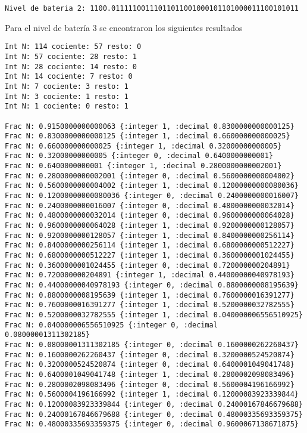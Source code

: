 \documentclass[stu, 12pt, letterpaper, donotrepeattitle, floatsintext, natbib]{apa7}
\begin{document}
\begin{verbatim}
Nivel de bateria 2: 1100.01111100111011011001000101101000011100101011
\end{verbatim}


Para el nivel de batería 3 se encontraron los siguientes resultados

\begin{verbatim}
Int N: 114 cociente: 57 resto: 0
Int N: 57 cociente: 28 resto: 1
Int N: 28 cociente: 14 resto: 0
Int N: 14 cociente: 7 resto: 0
Int N: 7 cociente: 3 resto: 1
Int N: 3 cociente: 1 resto: 1
Int N: 1 cociente: 0 resto: 1

Frac N: 0.9150000000000063 {:integer 1, :decimal 0.8300000000000125}
Frac N: 0.8300000000000125 {:integer 1, :decimal 0.660000000000025}
Frac N: 0.660000000000025 {:integer 1, :decimal 0.32000000000005}
Frac N: 0.32000000000005 {:integer 0, :decimal 0.6400000000001}
Frac N: 0.6400000000001 {:integer 1, :decimal 0.2800000000002001}
Frac N: 0.2800000000002001 {:integer 0, :decimal 0.5600000000004002}
Frac N: 0.5600000000004002 {:integer 1, :decimal 0.12000000000080036}
Frac N: 0.12000000000080036 {:integer 0, :decimal 0.2400000000016007}
Frac N: 0.2400000000016007 {:integer 0, :decimal 0.4800000000032014}
Frac N: 0.4800000000032014 {:integer 0, :decimal 0.9600000000064028}
Frac N: 0.9600000000064028 {:integer 1, :decimal 0.9200000000128057}
Frac N: 0.9200000000128057 {:integer 1, :decimal 0.8400000000256114}
Frac N: 0.8400000000256114 {:integer 1, :decimal 0.6800000000512227}
Frac N: 0.6800000000512227 {:integer 1, :decimal 0.3600000001024455}
Frac N: 0.3600000001024455 {:integer 0, :decimal 0.720000000204891}
Frac N: 0.720000000204891 {:integer 1, :decimal 0.44000000040978193}
Frac N: 0.44000000040978193 {:integer 0, :decimal 0.8800000008195639}
Frac N: 0.8800000008195639 {:integer 1, :decimal 0.7600000016391277}
Frac N: 0.7600000016391277 {:integer 1, :decimal 0.5200000032782555}
Frac N: 0.5200000032782555 {:integer 1, :decimal 0.040000006556510925}
Frac N: 0.040000006556510925 {:integer 0, :decimal 0.08000001311302185}
Frac N: 0.08000001311302185 {:integer 0, :decimal 0.1600000262260437}
Frac N: 0.1600000262260437 {:integer 0, :decimal 0.3200000524520874}
Frac N: 0.3200000524520874 {:integer 0, :decimal 0.6400001049041748}
Frac N: 0.6400001049041748 {:integer 1, :decimal 0.2800002098083496}
Frac N: 0.2800002098083496 {:integer 0, :decimal 0.5600004196166992}
Frac N: 0.5600004196166992 {:integer 1, :decimal 0.12000083923339844}
Frac N: 0.12000083923339844 {:integer 0, :decimal 0.24000167846679688}
Frac N: 0.24000167846679688 {:integer 0, :decimal 0.48000335693359375}
Frac N: 0.48000335693359375 {:integer 0, :decimal 0.9600067138671875}

\end{verbatim}
\end{document}
